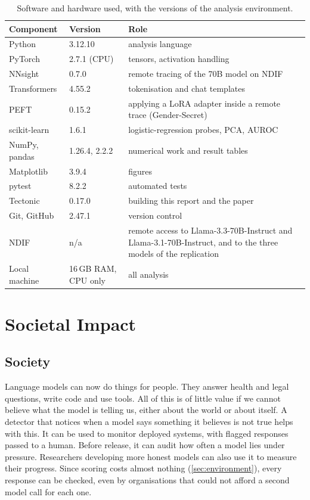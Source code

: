 \begin{table}[t]
\centering
\small
\caption{Software and hardware used, with the versions of the analysis environment.}
\label{tab:software}
\begin{tabularx}{\linewidth}{@{}l l X@{}}
\toprule
Component & Version & Role \\
\midrule
Python & 3.12.10 & analysis language \\
PyTorch & 2.7.1 (CPU) & tensors, activation handling \\
NNsight & 0.7.0 & remote tracing of the 70B model on NDIF \\
Transformers & 4.55.2 & tokenisation and chat templates \\
PEFT & 0.15.2 & applying a LoRA adapter inside a remote trace (Gender-Secret) \\
scikit-learn & 1.6.1 & logistic-regression probes, PCA, AUROC \\
NumPy, pandas & 1.26.4, 2.2.2 & numerical work and result tables \\
Matplotlib & 3.9.4 & figures \\
pytest & 8.2.2 & automated tests \\
Tectonic & 0.17.0 & building this report and the paper \\
Git, GitHub & 2.47.1 & version control \\
\midrule
NDIF & n/a & remote access to Llama-3.3-70B-Instruct and Llama-3.1-70B-Instruct, and to the
three models of the replication \\
Local machine & 16\,GB RAM, CPU only & all analysis \\
\bottomrule
\end{tabularx}
\end{table}

\section{Societal Impact}
\label{sec:societal}

\subsection{Society}

Language models can now do things for people. They answer health and legal questions, write
code and use tools. All of this is of little value if we cannot believe what the model is telling us,
either about the world or about itself. A detector that notices when a model says something it
believes is not true helps with this. It can be used to monitor deployed systems, with flagged
responses passed to a human. Before release, it can audit how often a model lies under
pressure. Researchers developing more honest models can also use it to measure their
progress. Since scoring costs almost nothing (\cref{sec:environment}), every response can be checked, even by
organisations that could not afford a second model call for each one.

